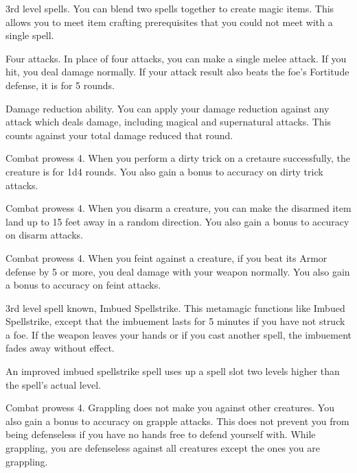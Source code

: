\featpre 3rd level spells.
\featben You can blend two spells together to create magic items.
This allows you to meet item crafting prerequisites that you could not meet with a single spell.

\featpre Four attacks.
\featben In place of four attacks, you can make a single melee attack.
If you hit, you deal damage normally.
If your attack result also beats the foe's Fortitude defense, it is \immobilized for 5 rounds.

\featpre Damage reduction ability.
\featben You can apply your damage reduction against any attack which deals damage, including magical and supernatural attacks.
This counts against your total damage reduced that round.

\featpre Combat prowess 4.
\featben When you perform a dirty trick on a cretaure successfully, the creature is \impaired for 1d4 rounds.
You also gain a  bonus to accuracy on dirty trick attacks.

\featpre Combat prowess 4.
\featben When you disarm a creature, you can make the disarmed item land up to 15 feet away in a random direction.
You also gain a  bonus to accuracy on disarm attacks.

\featpre Combat prowess 4.
\featben When you feint against a creature, if you beat its Armor defense by 5 or more, you deal damage with your weapon normally.
You also gain a  bonus to accuracy on feint attacks.

\featpres 3rd level spell known, Imbued Spellstrike.
\featben This metamagic functions like Imbued Spellstrike, except that the imbuement lasts for 5 minutes if you have not struck a foe.
If the weapon leaves your hands or if you cast another spell, the imbuement fades away without effect.

An improved imbued spellstrike spell uses up a spell slot two levels higher than the spell's actual level.

\featpre Combat prowess 4.
\featben Grappling does not make you  against other creatures.
You also gain a  bonus to accuracy on grapple attacks.
This does not prevent you from being defenseless if you have no hands free to defend yourself with.
While grappling, you are defenseless against all creatures except the ones you are grappling.

